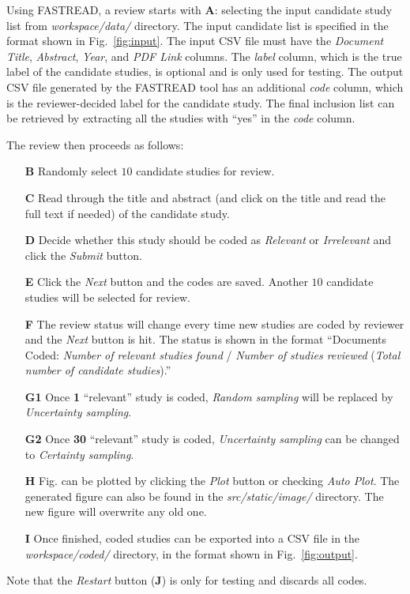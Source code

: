 \documentclass{svjour3}
\theoremstyle{break}
\begin{document}
Using FASTREAD, a review starts with \textbf{A}: selecting the input candidate study list from \textit{workspace/data/} directory. The input candidate list is specified in the format shown in Fig.~\ref{fig:input}. The input CSV file must have the \textit{Document Title}, \textit{Abstract}, \textit{Year}, and \textit{PDF Link} columns. The \textit{label} column, which is the true label of the candidate studies, is optional and is only used for testing. The output CSV file generated by the FASTREAD tool has an additional \textit{code} column, which is the reviewer-decided label for the candidate study. The final inclusion list can be retrieved by extracting all the studies with ``yes'' in the \textit{code} column.

The review then proceeds as follows:
\begin{enumerate}
\item[\textbf{B}] Randomly select $10$ candidate studies for review.
\item[\textbf{C}] Read through the title and abstract (and click on the title and read the full text if needed) of the candidate study.
\item[\textbf{D}] Decide whether this study should be coded as \textit{Relevant} or \textit{Irrelevant} and click the \textit{Submit} button.
\item[\textbf{E}] Click the \textit{Next} button and the codes are saved. Another $10$ candidate studies will be selected for review.
\item[\textbf{F}] The review status will change every time new studies are coded by reviewer and the \textit{Next} button is hit. The status is shown in the format ``Documents Coded: \textit{Number of relevant studies found} / \textit{Number of studies reviewed} (\textit{Total number of candidate studies}).''
\item[\textbf{G1}] Once \textbf{1} ``relevant'' study is coded, \textit{Random sampling} will be replaced by \textit{Uncertainty sampling}.
\item[\textbf{G2}] Once \textbf{30} ``relevant'' study is coded, \textit{Uncertainty sampling} can be changed to \textit{Certainty sampling}.
\item[\textbf{H}] Fig. can be plotted by clicking the \textit{Plot} button or checking \textit{Auto Plot}. The generated figure can also be found in the \textit{src/static/image/} directory. The new figure will overwrite any old one.
\item[\textbf{I}] Once finished, coded studies can be exported into a CSV file in the \textit{workspace/coded/} directory, in the format shown in Fig.~\ref{fig:output}.
\end{enumerate}
Note that the \textit{Restart} button (\textbf{J}) is only for testing and discards all codes.
\end{document}
